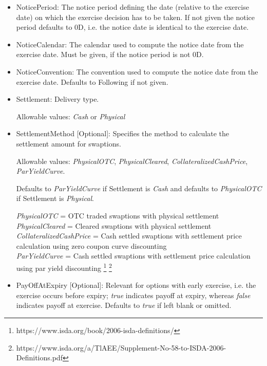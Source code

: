 \begin{itemize}
\item NoticePeriod: The notice period defining the date (relative to the exercise date) on which the exercise decision
  has to be taken. If not given the notice period defaults to 0D, i.e. the notice date is identical to the exercise date.

\item NoticeCalendar: The calendar used to compute the notice date from the exercise date. Must be given, if the notice
  period is not 0D.

\item NoticeConvention: The convention used to compute the notice date from the exercise date. Defaults to Following if
  not given.

\item Settlement: Delivery type. 

  Allowable values: \emph{Cash} or \emph{Physical}

\item SettlementMethod [Optional]: Specifies the method to calculate the settlement amount for swaptions.

  Allowable values: \emph{PhysicalOTC}, \emph{PhysicalCleared}, \emph{CollateralizedCashPrice},\\ \emph{ParYieldCurve}. 
  
  Defaults to \emph{ParYieldCurve} if Settlement is \emph{Cash} and defaults to \emph{PhysicalOTC} if Settlement is \emph{Physical}.

\emph{PhysicalOTC} = OTC traded swaptions with physical settlement\\
\emph{PhysicalCleared} = Cleared swaptions with physical settlement\\
\emph{CollateralizedCashPrice} = Cash settled swaptions with settlement price calculation using zero coupon curve discounting \\
\emph{ParYieldCurve}  = Cash settled swaptions with settlement price calculation using par yield discounting \footnote{https://www.isda.org/book/2006-isda-definitions/} \footnote{https://www.isda.org/a/TlAEE/Supplement-No-58-to-ISDA-2006-Definitions.pdf} \\

\item PayOffAtExpiry [Optional]: Relevant for options with early
  exercise, i.e. the exercise occurs before expiry; \emph{true}
  indicates payoff at expiry, whereas \emph{false}  indicates payoff
  at exercise. Defaults to \emph{true}  if left blank or omitted. 


\end{itemize}
